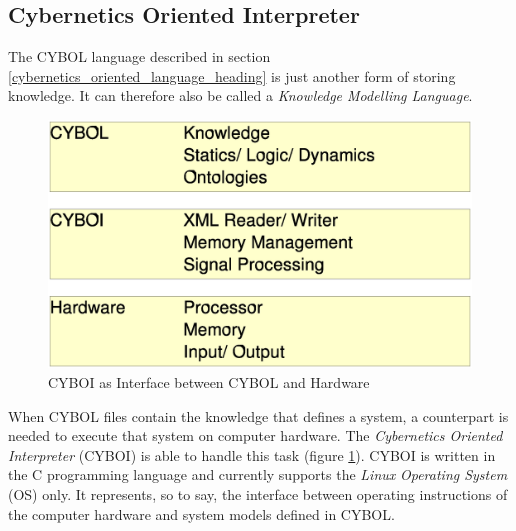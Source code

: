 %
%
%
%
%
%
%

\subsection{Cybernetics Oriented Interpreter}
\label{cybernetics_oriented_interpreter_heading}

The CYBOL language described in section \ref{cybernetics_oriented_language_heading}
is just another form of storing knowledge. It can therefore also be called a
\emph{Knowledge Modelling Language}.

\begin{figure}[ht]
    \begin{center}
        \includegraphics[scale=0.3]{vector/hardware_connection.eps}
        \caption{CYBOI as Interface between CYBOL and Hardware}
        \label{hardware_connection_figure}
    \end{center}
\end{figure}

When CYBOL files contain the knowledge that
defines a system, a counterpart is needed to execute that system on computer
hardware. The \emph{Cybernetics Oriented Interpreter} (CYBOI) is able to handle
this task (figure \ref{hardware_connection_figure}).
CYBOI is written in the C programming language and currently supports the
\emph{Linux} \emph{Operating System} (OS) only. It represents, so to say, the
interface between operating instructions of the computer hardware and system
models defined in CYBOL.

